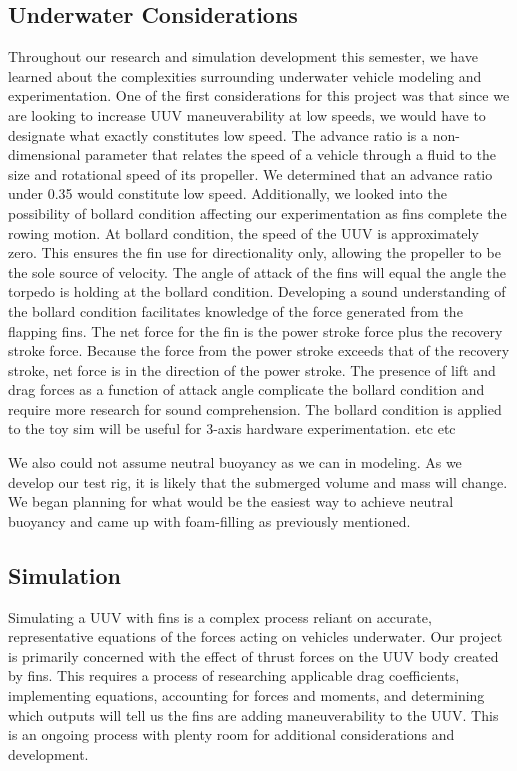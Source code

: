 \documentclass[twocolumn,10pt]{IEEEtran}
\begin{document}
\subsection{Underwater Considerations}
Throughout our research and simulation development this semester, we have learned about the complexities surrounding underwater vehicle modeling and experimentation. One of the first considerations for this project was that since we are looking to increase UUV maneuverability at low speeds, we would have to designate what exactly constitutes low speed. The advance ratio is a non-dimensional parameter that relates the speed of a vehicle through a fluid to the size and rotational speed of its propeller. We determined that an advance ratio under 0.35 would constitute low speed. Additionally, we looked into the possibility of bollard condition affecting our experimentation as fins complete the rowing motion.  At bollard condition, the speed of the UUV is approximately zero.  This ensures the fin use for directionality only, allowing the propeller to be the sole source of velocity.  The angle of attack of the fins will equal the angle the torpedo is holding at the bollard condition.  Developing a sound understanding of the bollard condition facilitates knowledge of the force generated from the flapping fins.  The net force for the fin is the power stroke force plus the recovery stroke force.  Because the force from the power stroke exceeds that of the recovery stroke, net force is in the direction of the power stroke.  The presence of lift and drag forces as a function of attack angle complicate the bollard condition and require more research for sound comprehension.  The bollard condition is applied to the toy sim will be useful for 3-axis hardware experimentation.  etc etc

We also could not assume neutral buoyancy as we can in modeling. As we develop our test rig, it is likely that the submerged volume and mass will change. We began planning for what would be the easiest way to achieve neutral buoyancy and came up with foam-filling as previously mentioned. 

\subsection{Simulation}
Simulating a UUV with fins is a complex process reliant on accurate, representative equations of the forces acting on vehicles underwater. Our project is primarily concerned with the effect of thrust forces on the UUV body created by fins. This requires a process of researching applicable drag coefficients, implementing equations, accounting for forces and moments, and determining which outputs will tell us the fins are adding maneuverability to the UUV. This is an ongoing process with plenty room for additional considerations and development.
\end{document}
